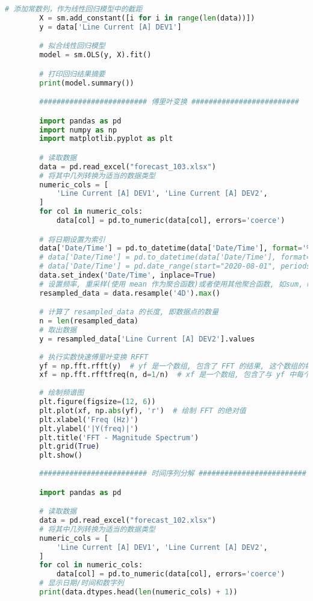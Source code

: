 \documentclass[withoutpreface,bwprint]{cumcmthesis}  %
\begin{document}
\begin{appendices}
\begin{lstlisting}[language=python]
        # 添加常数列，作为线性回归模型中的截距
        X = sm.add_constant([i for i in range(len(data))])
        y = data['Line Current [A] DEV1']

        # 拟合线性回归模型
        model = sm.OLS(y, X).fit()

        # 打印回归结果摘要
        print(model.summary())

        ######################### 傅里叶变换 #########################

        import pandas as pd  
        import numpy as np  
        import matplotlib.pyplot as plt  

        # 读取数据
        data = pd.read_excel("forecast_103.xlsx")
        # 将其中几列转换为适当的数据类型
        numeric_cols = [
            'Line Current [A] DEV1', 'Line Current [A] DEV2', 
        ]
        for col in numeric_cols:
            data[col] = pd.to_numeric(data[col], errors='coerce')

        # 将日期设置为索引
        data['Date/Time'] = pd.to_datetime(data['Date/Time'], format='%Y/%m/%d %H:%M:%S', errors='coerce')
        # data['Date/Time'] = pd.to_datetime(data['Date/Time'], format='%d.%m.%Y. %H:%M:%S', errors='coerce')
        # data['Date/Time'] = pd.date_range(start="2020-08-01", periods=4707, freq='9min')
        data.set_index('Date/Time', inplace=True)
        # 设置频率, 重采样(使用 mean 作为聚合函数)或者使用其他聚合函数, 如sum, min, max等
        resampled_data = data.resample('4D').max()    

        # 计算了 resampled_data 的长度, 即数据点的数量
        n = len(resampled_data)  
        # 取出数据
        y = resampled_data['Line Current [A] DEV2'].values  
  
        # 执行实数快速傅里叶变换 RFFT
        yf = np.fft.rfft(y)  # yf 是一个数组, 包含了 FFT 的结果, 这个数组的每个元素都代表了一个频率分量的幅度和相位
        xf = np.fft.rfftfreq(n, d=1/n)  # xf 是一个数组, 包含了与 yf 中每个 FFT 结果对应的频率值
   
        # 绘制频谱图  
        plt.figure(figsize=(12, 6))  
        plt.plot(xf, np.abs(yf), 'r')  # 绘制 FFT 的绝对值  
        plt.xlabel('Freq (Hz)')  
        plt.ylabel('|Y(freq)|')  
        plt.title('FFT - Magnitude Spectrum')  
        plt.grid(True)  
        plt.show()  
            
        ######################### 时间序列分解 #########################

        import pandas as pd

        # 读取数据
        data = pd.read_excel("forecast_102.xlsx")
        # 将其中几列转换为适当的数据类型
        numeric_cols = [
            'Line Current [A] DEV1', 'Line Current [A] DEV2', 
        ]
        for col in numeric_cols:
            data[col] = pd.to_numeric(data[col], errors='coerce')
        # 显示日期/时间和数字列
        print(data.dtypes.head(len(numeric_cols) + 1))


\end{lstlisting}
\end{appendices}
\end{document}
